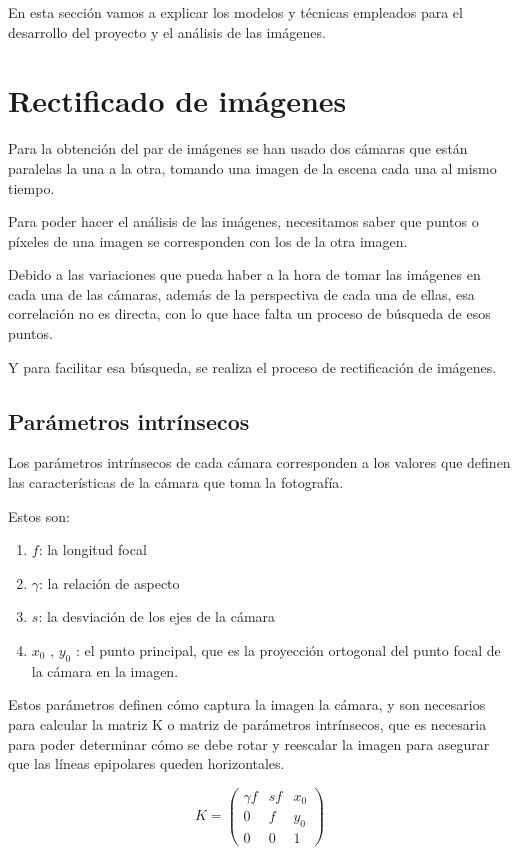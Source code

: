 
En esta sección vamos a explicar los modelos y técnicas empleados para el desarrollo del proyecto y el análisis de las imágenes.

\section{Rectificado de imágenes}

Para la obtención del par de imágenes se han usado dos cámaras que están paralelas la una a la otra, tomando una imagen de la escena cada una al mismo tiempo.

Para poder hacer el análisis de las imágenes, necesitamos saber que puntos o píxeles de una imagen se corresponden con los de la otra imagen.

Debido a las variaciones que pueda haber a la hora de tomar las imágenes en cada una de las cámaras, además de la perspectiva de cada una de ellas, esa correlación no es directa, con lo que hace falta un proceso de búsqueda de esos puntos.

Y para facilitar esa búsqueda, se realiza el proceso de rectificación de imágenes.

\subsection{Parámetros intrínsecos}
Los parámetros intrínsecos de cada cámara corresponden a los valores que definen las características de la cámara que toma la fotografía.

Estos son:
\begin{enumerate}
	\item $f$: la longitud focal
	\item $\gamma$: la relación de aspecto
	\item $s$: la desviación de los ejes de la cámara
	\item $x_{0}$ , $y_{0}$ : el punto principal, que es la proyección ortogonal del punto focal de la cámara en la imagen.
\end{enumerate}

Estos parámetros definen cómo captura la imagen la cámara, y son necesarios para calcular la matriz K o matriz de parámetros intrínsecos, que es necesaria para poder determinar cómo se debe rotar y reescalar la imagen para asegurar que las líneas epipolares queden horizontales.

\[
K=
\begin{pmatrix}
	\gamma f & s f & x_{0} \\
	0 & f & y_{0} \\
	0 & 0 & 1
\end{pmatrix}
\]

